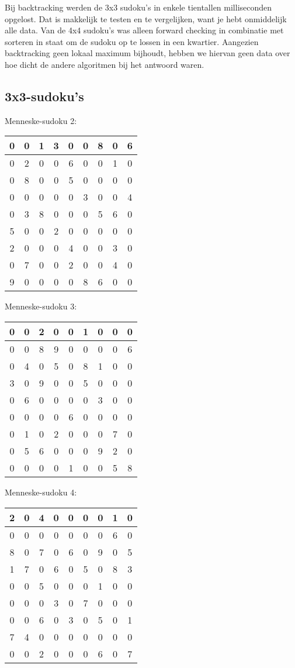 \documentclass[]{report}
\begin{document}
Bij backtracking werden de 3x3 sudoku's in enkele tientallen milliseconden opgelost. Dat is makkelijk te testen en te vergelijken, want je hebt onmiddelijk alle data. Van de 4x4 sudoku's was alleen forward checking in combinatie met sorteren in staat om de sudoku op te lossen in een kwartier. Aangezien backtracking geen lokaal maximum bijhoudt, hebben we hiervan geen data over hoe dicht de andere algoritmen bij het antwoord waren.

 

\subsection{3x3-sudoku's}
Menneske-sudoku 2:
\begin{tabular}{|c|c|c||c|c|c||c|c|c|}
\hline
0 &0& 1& 3& 0& 0& 8& 0& 6 \\ \hline
0 &2 &0 &0 &6 &0 &0& 1& 0\\ \hline
0& 8& 0& 0& 5& 0& 0& 0& 0\\ \hline\hline
0& 0& 0& 0& 0& 3& 0& 0& 4\\ \hline
0 &3 &8 &0 &0 &0 &5 &6 &0\\ \hline
5& 0& 0& 2& 0& 0& 0& 0& 0\\ \hline\hline
2& 0& 0& 0& 4& 0& 0& 3& 0\\ \hline
0 &7 &0 &0 &2 &0 &0 &4 &0\\ \hline
9 &0 &0 &0 &0 &8 &6 &0& 0\\ \hline
\end{tabular}

Menneske-sudoku 3:
\begin{tabular}{|c|c|c||c|c|c||c|c|c|}
\hline
0&0&2&0&0&1&0&0&0 \\ \hline
0&0&8&9&0&0&0&0&6\\ \hline
0&4&0&5&0&8&1&0&0\\ \hline \hline
3&0&9&0&0&5&0&0&0\\ \hline
0&6&0&0&0&0&3&0&0\\ \hline
0&0&0&0&6&0&0&0&0\\ \hline \hline
0&1&0&2&0&0&0&7&0\\ \hline
0&5&6&0&0&0&9&2&0\\ \hline
0&0&0&0&1&0&0&5&8\\ \hline
\end{tabular}

Menneske-sudoku 4:
\begin{tabular}{|c|c|c||c|c|c||c|c|c|}
\hline
2&0&4&0&0&0&0&1&0 \\ \hline
0&0&0&0&0&0&0&6&0\\ \hline
8&0&7&0&6&0&9&0&5\\ \hline \hline
1&7&0&6&0&5&0&8&3\\ \hline
0&0&5&0&0&0&1&0&0\\ \hline
0&0&0&3&0&7&0&0&0\\ \hline \hline
0&0&6&0&3&0&5&0&1\\ \hline
7&4&0&0&0&0&0&0&0\\ \hline
0&0&2&0&0&0&6&0&7\\ \hline
\end{tabular}
\end{document}
